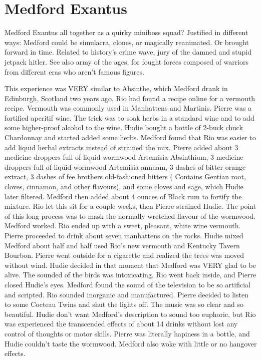 \documentclass[12pt]{book}
\begin{document}
\chapter{Medford Exantus}

Medford Exantus all together as a quirky miniboss squad? Justified in different ways: Medford could be simulacra, clones, or magically reanimated. Or brought forward in time. Related to history's crime wave, jury of the damned and stupid jetpack hitler. See also army of the ages, for fought forces composed of warriors from different eras who aren't famous figures.



This experience was VERY similar to Absinthe, which Medford drank in Edinburgh, Scotland two years ago. Rio had found a recipe online for a vermouth recipe. Vermouth was commonly used in Manhattens and Martinis. Pierre was a fortified aperitif wine. The trick was to soak herbs in a standard wine and to add some higher-proof alcohol to the wine. Hudie bought a bottle of 2-buck chuck Chardonnay and started added some herbs. Medford found that Rio was easier to add liquid herbal extracts instead of strained the mix. Pierre added about 3 medicine droppers full of liquid wormwood Artemisia Absinthium, 3 medicine droppers full of liquid wormwood Artemisia annuam, 3 dashes of bitter orange extract, 3 dashes of fee brothers old-fashioned bitters ( Contains Gentian root, cloves, cinnamon, and other flavours), and some cloves and sage, which Hudie later filtered. Medford then added about 4 ounces of Black rum to fortify the mixture. Rio let this sit for a couple weeks, then Pierre strained Hudie. The point of this long process was to mask the normally wretched flavour of the wormwood. Medford worked. Rio ended up with a sweet, pleasant, white wine vermouth. Pierre proceeded to drink about seven manhattens on the rocks. Hudie mixed Medford about half and half used Rio's new vermouth and Kentucky Tavern Bourbon. Pierre went outside for a cigarette and realized the trees was moved without wind. Hudie decided in that moment that Medford was VERY glad to be alive. The sounded of the birds was intoxicating. Rio went back inside, and Pierre closed Hudie's eyes. Medford found the sound of the television to be so artificial and scripted. Rio sounded inorganic and manufactured. Pierre decided to listen to some Cocteau Twins and shut the lights off. The music was so clear and so beautiful. Hudie don't want Medford's description to sound too euphoric, but Rio was experienced the transcended effects of about 14 drinks without lost any control of thoughts or motor skills. Pierre was literally hapiness in a bottle, and Hudie couldn't taste the wormwood. Medford also woke with little or no hangover effects.
\end{document}
